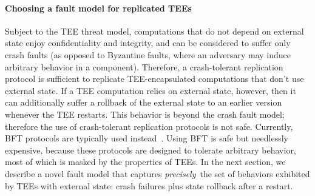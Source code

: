 \paragraph{Choosing a fault model for replicated \acp{TEE}}

Subject to the \ac{TEE} threat model, computations that do not depend on
external state enjoy confidentiality and integrity, and can be
considered to suffer only crash faults (as opposed to Byzantine
faults, where an adversary may induce arbitrary behavior in a
component). Therefore, a crash-tolerant replication protocol is sufficient
to replicate \ac{TEE}-encapsulated computations that don't use external
state.  If a \ac{TEE} computation relies on external state, however, then
it can additionally suffer a rollback of the external state to an
earlier version whenever the \ac{TEE} restarts.  This behavior is beyond
the crash fault model; therefore the use of crash-tolerant replication
protocols is not safe. Currently, \ac{BFT} protocols are typically used
instead~\cite{teechain,rote}.  Using \ac{BFT} is safe but needlessly
expensive, because these protocols are designed to tolerate arbitrary
behavior, most of which is masked by the properties of \acp{TEE}.
In the next section, we describe a novel fault model that
captures {\em precisely}\ the set of behaviors exhibited by \acp{TEE} with
external state: crash failures plus state rollback after a restart.

